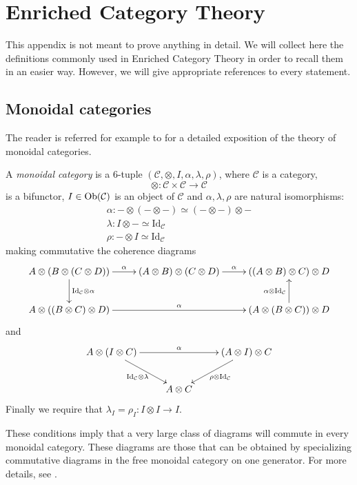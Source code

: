 \chapter{Enriched Category Theory}

This appendix is not meant to prove anything in detail. We will collect here the definitions commonly used in Enriched Category Theory in order to recall them in an easier way. However, we will give appropriate references to every statement.

\section{Monoidal categories}

The reader is referred for example to \cite[Ch. VII]{cwm} for a detailed exposition of the theory of monoidal categories.

\begin{defin}
A \emph{monoidal category} is a 6-tuple $(\mathcal C, \otimes, I, \alpha, \lambda, \rho)$, where $\mathcal C$ is a category,
\[
\otimes \colon \mathcal C \times \mathcal C \to \mathcal C
\]
is a bifunctor, $I \in \mathrm{Ob}(\mathcal C)$ is an object of $\mathcal C$ and $\alpha, \lambda, \rho$ are natural isomorphisms:
\begin{gather*}
\alpha \colon - \otimes (- \otimes -) \simeq (- \otimes -) \otimes - \\
\lambda \colon I \otimes - \simeq \mathrm{Id}_{\mathcal C} \\
\rho \colon - \otimes I \simeq \mathrm{Id}_{\mathcal C}
\end{gather*}
making commutative the coherence diagrams
\[
\xymatrix{
A \otimes (B \otimes (C \otimes D)) \ar[d]^{\mathrm{Id}_{\mathcal C} \otimes \alpha} \ar[r]^-\alpha & (A \otimes B) \otimes (C \otimes D) \ar[r]^\alpha & ((A \otimes B) \otimes C) \otimes D \\ A \otimes ((B \otimes C) \otimes D) \ar[rr]^\alpha & & (A \otimes (B \otimes C)) \otimes D \ar[u]^{\alpha \otimes \mathrm{Id}_{\mathcal C}}
}
\]
and
\[
\xymatrix{
A \otimes (I \otimes C) \ar[rr]^-\alpha  \ar[dr]_{\mathrm{Id}_{\mathcal C} \otimes \lambda} & & (A \otimes I) \otimes C \ar[dl]^{\rho \otimes \mathrm{Id}_{\mathcal C}} \\ & A \otimes C
}
\]
Finally we require that $\lambda_I = \rho_I \colon I \otimes I \to I$.
\end{defin}

These conditions imply that a very large class of diagrams will commute in every monoidal category. These diagrams are those that can be obtained by specializing commutative diagrams in the free monoidal category on one generator. For more details, see \cite[Ch. VII.2]{cwm}.

